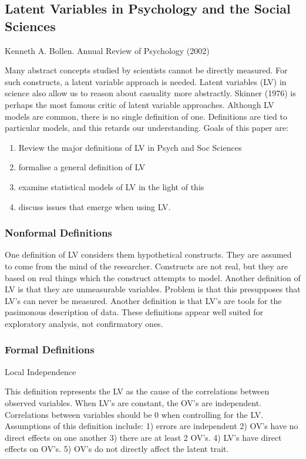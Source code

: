 \subsection{Latent Variables in Psychology and the Social Sciences}
Kenneth A. Bollen.
Annual Review of Psychology (2002)

Many abstract concepts studied by scientists cannot be directly measured. For such constructs, a latent variable approach is needed.
Latent variables (LV) in science also allow us to reason about casuality more abstractly.
Skinner (1976) is perhaps the most famous critic of latent variable approaches. 
Although LV models are common, there is no single definition of one. Definitions are tied to particular models, and this retards our understanding. 
Goals of this paper are:
\begin{enumerate}

\item Review the major definitions of LV in Psych and Soc Sciences
\item formalise a general definition of LV
\item examine statistical models of LV in the light of this
\item discuss issues that emerge when using LV. 

\end{enumerate}

\subsubsection{Nonformal Definitions}

One definition of LV considers them hypothetical constructs.
They are assumed to come from the mind of the researcher.
Constructs are not real, but they are based on real things which the construct attempts to model.
Another definition of LV is that they are unmeasurable variables. 
Problem is that this presupposes that LV's can never be measured.
Another definition is that LV's are tools for the pasimonous description of data.
These definitions appear well suited for exploratory analysis, not confirmatory ones. 

\subsubsection{Formal Definitions}

Local Independence

This definition represents the LV as the cause of the correlations between observed variables. When LV's are constant, the OV's are independent.
Correlations between variables should be 0 when controlling for the LV.
Assumptions of this definition include:
1) errors are independent
2) OV's have no direct effects on one another
3) there are at least 2 OV's.
4) LV's have direct effects on OV's.
5) OV's do not directly affect the latent trait.


